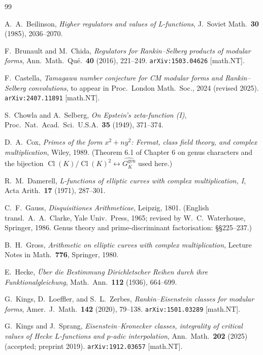\documentclass[11pt,a4paper]{amsart}
\theoremstyle{plain}
\theoremstyle{definition}
\DeclareMathOperator{\Cl}{Cl}
\begin{document}
\begin{thebibliography}{99}

A.~A.~Beilinson,
\textit{Higher regulators and values of L-functions},
J.~Soviet Math.\ \textbf{30} (1985), 2036--2070.

F.~Brunault and M.~Chida,
\textit{Regulators for Rankin--Selberg products of modular forms},
Ann.\ Math.\ Qu\'e.\ \textbf{40} (2016), 221--249.
\texttt{arXiv:1503.04626} [math.NT].

F.~Castella,
\textit{Tamagawa number conjecture for CM modular forms and Rankin--Selberg
convolutions},
to appear in Proc.\ London Math.\ Soc., 2024 (revised 2025).
\texttt{arXiv:2407.11891} [math.NT].

S.~Chowla and A.~Selberg,
\textit{On Epstein's zeta-function (I)},
Proc.\ Nat.\ Acad.\ Sci.\ U.S.A.\ \textbf{35} (1949), 371--374.

D.~A.~Cox,
\emph{Primes of the form $x^2 + n y^2$: Fermat, class field theory, and
complex multiplication},
Wiley, 1989.
(Theorem 6.1 of Chapter 6 on genus characters and the bijection
$\Cl(K)/\Cl(K)^2\leftrightarrow\widehat{G_K^{\mathrm{gen}}}$ used here.)

R.~M.~Damerell,
\textit{L-functions of elliptic curves with complex multiplication, I},
Acta Arith.\ \textbf{17} (1971), 287--301.

C.~F.~Gauss,
\emph{Disquisitiones Arithmeticae},
Leipzig, 1801.
(English transl.\ A.~A.~Clarke, Yale Univ.\ Press, 1965;
revised by W.~C.~Waterhouse, Springer, 1986.
Genus theory and prime-discriminant factorisation: \S\S 225--237.)

B.~H.~Gross,
\emph{Arithmetic on elliptic curves with complex multiplication},
Lecture Notes in Math.\ \textbf{776}, Springer, 1980.

E.~Hecke,
\textit{\"Uber die Bestimmung Dirichletscher Reihen durch ihre
Funktionalgleichung},
Math.\ Ann.\ \textbf{112} (1936), 664--699.

G.~Kings, D.~Loeffler, and S.~L.~Zerbes,
\textit{Rankin--Eisenstein classes for modular forms},
Amer.\ J.\ Math.\ \textbf{142} (2020), 79--138.
\texttt{arXiv:1501.03289} [math.NT].

G.~Kings and J.~Sprang,
\textit{Eisenstein--Kronecker classes, integrality of critical values of
Hecke $L$-functions and $p$-adic interpolation},
Ann.\ Math.\ \textbf{202} (2025) (accepted; preprint 2019).
\texttt{arXiv:1912.03657} [math.NT].


\end{thebibliography}
\end{document}
